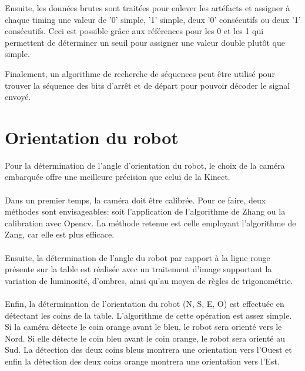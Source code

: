 Ensuite, les données brutes sont traitées pour enlever les artéfacts et assigner à chaque timing une valeur de '0' simple, '1' simple, deux '0' consécutifs ou deux '1' consécutifs. Ceci est possible grâce aux références pour les 0 et les 1 qui permettent de déterminer un seuil pour assigner une valeur double plutôt que simple.

Finalement, un algorithme de recherche de séquences peut être utilisé pour trouver la séquence des bits d'arrêt et de départ pour pouvoir décoder le signal envoyé.

\section{Orientation du robot}

Pour la détermination de l'angle d’orientation du robot, le choix de la caméra embarquée offre une meilleure précision que celui de la Kinect. 

\paragraph{}Dans un premier temps, la caméra doit être calibrée. Pour ce faire, deux méthodes sont envisageables: soit l’application de l’algorithme de Zhang ou la calibration avec Opencv. La méthode retenue est celle employant l'algorithme de Zang, car elle est plus efficace. 

\paragraph{}Ensuite, la détermination de l’angle du robot par rapport à la ligne rouge présente sur la table est réalisée avec un traitement d’image supportant la variation de luminosité, d’ombres, ainsi qu'au moyen de règles de trigonométrie.

\paragraph{}Enfin,  la détermination de l’orientation du robot (N, S, E, O) est effectuée en détectant les coins de la table. 
L’algorithme de cette opération est assez simple. Si la caméra détecte le coin orange avant le bleu, le robot sera orienté vers le Nord. Si elle détecte le coin bleu avant le coin orange, le robot sera orienté au Sud. La détection des deux coins bleus montrera une orientation vers l’Ouest et enfin la détection des deux coins orange montrera une orientation vers l’Est.

